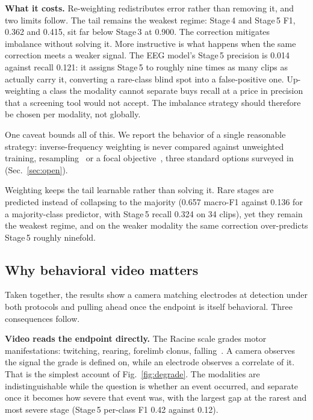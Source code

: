 \noindent\textbf{What it costs.}
Re-weighting redistributes error rather than removing it, and two limits follow.
The tail remains the weakest regime: Stage\,4 and Stage\,5 F1, 0.362 and 0.415, sit far below Stage\,3 at 0.900. The correction mitigates imbalance without solving it. More
instructive is what happens when the same correction meets a weaker signal. The EEG
model's Stage\,5 precision is 0.014 against recall 0.121: it assigns Stage\,5 to
roughly nine times as many clips as actually carry it, converting a rare-class blind
spot into a false-positive one. Up-weighting a class the modality cannot separate buys recall at a price in precision that a screening tool would not accept. The imbalance strategy should therefore be chosen per modality, not globally.

One caveat bounds all of this. We report the behavior of a single reasonable strategy: inverse-frequency weighting is never compared against unweighted training, resampling~\cite{chawla2002smote} or a focal objective~\cite{lin2017focal}, three standard options surveyed in~\cite{johnson2019imbalance} (Sec.~\ref{sec:open}).

\begin{takeaway}
\takeawaylabel Weighting keeps the tail learnable rather than solving it. Rare stages are
predicted instead of collapsing to the majority (0.657 macro-F1 against 0.136 for a
majority-class predictor, with Stage\,5 recall 0.324 on 34 clips), yet they remain
the weakest regime, and on the weaker modality the same correction over-predicts
Stage\,5 roughly ninefold.
\end{takeaway}

\subsection{Why behavioral video matters}
\label{sec:discussion}

Taken together, the results show a camera matching electrodes at detection under
both protocols and pulling ahead once the endpoint is itself behavioral. Three
consequences follow.

\noindent\textbf{Video reads the endpoint directly.}
The Racine scale grades motor manifestations: twitching, rearing, forelimb clonus,
falling~\cite{racine1972}. A camera observes the signal the grade is defined on,
while an electrode observes a correlate of it. That is the simplest account of
Fig.~\ref{fig:degrade}. The modalities are indistinguishable while the question is
whether an event occurred, and separate once it becomes how severe that event was,
with the largest gap at the rarest and most severe stage (Stage\,5 per-class F1
0.42 against 0.12).

